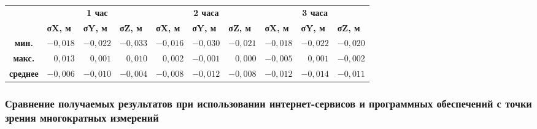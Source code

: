 \begin{table} [htbp]
	\centering\small
	\label{tab:tab14}{%
			\begin{tabular}{|c|rrr|rrr|rrr|}
				\hline
				\multirow{2}{*}{\textbf{ }} & \multicolumn{3}{c|}{\textbf{1 час}}  & \multicolumn{3}{c|}{\textbf{2 часа}}  & \multicolumn{3}{c|}{\textbf{3 часа}}  \\ \cline{2-10} & 
				\multicolumn{1}{l|}{\textbf{σX, м}} & \multicolumn{1}{l|}{\textbf{σY, м}} & \multicolumn{1}{l|}{\textbf{σZ, м}} & \multicolumn{1}{l|}{\textbf{σX, м}} & \multicolumn{1}{l|}{\textbf{σY, м}} & \multicolumn{1}{l|}{\textbf{σZ, м}} & \multicolumn{1}{l|}{\textbf{σX, м}} & \multicolumn{1}{l|}{\textbf{σY, м}} & \multicolumn{1}{l|}{\textbf{σZ, м}} \\ \hline
				\textbf{мин.}                      & 
				\multicolumn{1}{r|}{$-0,018$}      & \multicolumn{1}{r|}{$-0,022$}       & $-0,033$                            & \multicolumn{1}{r|}{$-0,016$}      & \multicolumn{1}{r|}{$-0,030$}       & $-0,021$                            & \multicolumn{1}{r|}{$-0,018$}      & \multicolumn{1}{r|}{$-0,022$}       & $-0,020$                            \\ \hline
				\textbf{макс.}                     & 
				\multicolumn{1}{r|}{$ 0,013$}       & \multicolumn{1}{r|}{$ 0,001$}      & $ 0,010$                            & \multicolumn{1}{r|}{$ 0,002$}       & \multicolumn{1}{r|}{$-0,001$}      & $ 0,000$                            & \multicolumn{1}{r|}{$-0,005$}       & \multicolumn{1}{r|}{$ 0,001$}      & $-0,002$                            \\ \hline
				\textbf{среднее}                    & 
				\multicolumn{1}{r|}{$-0,006$}       & \multicolumn{1}{r|}{$-0,010$}      & $-0,004$                            & \multicolumn{1}{r|}{$-0,008$}       & \multicolumn{1}{r|}{$-0,012$}      & $-0,008$                            & \multicolumn{1}{r|}{$-0,012$}       & \multicolumn{1}{r|}{$-0,014$}      & $-0,011$                            \\ \hline
			\end{tabular}
		}
	\end{table}
	





\subsubsection{Сравнение получаемых результатов при использовании интернет-сервисов и программных обеспечений с точки зрения многократных измерений }\label{subsec:ch2/sec3/sub1/sub5}

